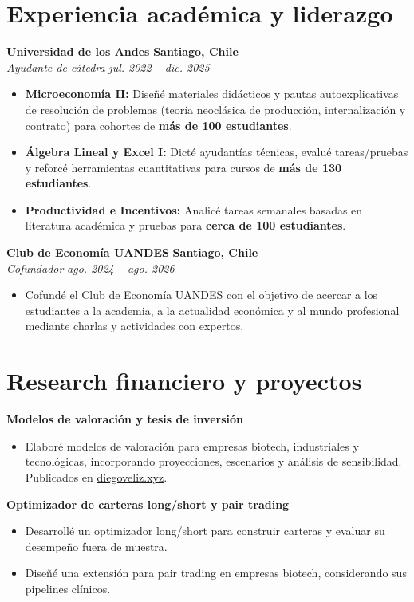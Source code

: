 \documentclass[10pt,letterpaper]{article}
\begin{document}
\section{Experiencia académica y liderazgo}
\textbf{Universidad de los Andes} \hfill \textbf{Santiago, Chile} \\
\textit{Ayudante de cátedra} \hfill \textit{jul. 2022 -- dic. 2025}
\begin{itemize}
	\item \textbf{Microeconomía II:} Diseñé materiales didácticos
		y pautas autoexplicativas de resolución de problemas
		(teoría neoclásica de producción, internalización y contrato)
		para cohortes de \textbf{más de 100 estudiantes}.
	\item \textbf{Álgebra Lineal y Excel I:} Dicté ayudantías técnicas, evalué
		tareas/pruebas y reforcé herramientas cuantitativas para cursos de
		\textbf{más de 130 estudiantes}.
	\item \textbf{Productividad e Incentivos:} Analicé tareas semanales basadas
		en literatura académica y pruebas para 
		\textbf{cerca de 100 estudiantes}.
\end{itemize}

\vspace{2pt}
\textbf{Club de Economía UANDES} \hfill \textbf{Santiago, Chile} \\
\textit{Cofundador} \hfill \textit{ago. 2024 -- ago. 2026}
\begin{itemize}
	\item Cofundé el Club de Economía UANDES con el objetivo de acercar a los 
		estudiantes a la academia, a la actualidad económica y al mundo profesional 
		mediante charlas y actividades con expertos.
\end{itemize}

\section{Research financiero y proyectos}
\textbf{Modelos de valoración y tesis de inversión}
\begin{itemize}
	\item Elaboré modelos de valoración para empresas biotech, 
		industriales y tecnológicas, incorporando proyecciones, escenarios 
		y análisis de sensibilidad. Publicados en 
		\underline{\href{https://diegoveliz.xyz}{diegoveliz.xyz}}.
\end{itemize}

\vspace{2pt}
\textbf{Optimizador de carteras long/short y pair trading}
\begin{itemize}
	\item Desarrollé un optimizador long/short para construir 
		carteras y evaluar su desempeño fuera de muestra.
	\item Diseñé una extensión para pair trading en empresas biotech, 
		considerando sus pipelines clínicos.
\end{itemize}
\end{document}
